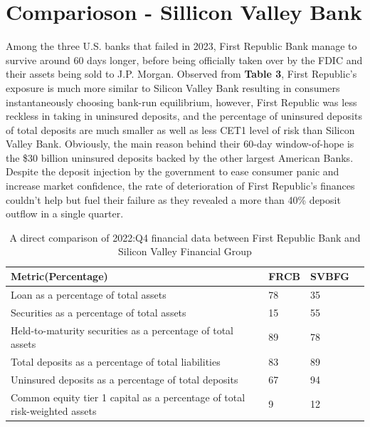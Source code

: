 \documentclass[a4paper]{article}
\begin{document}
\section{Comparioson - Sillicon Valley Bank} \label{Comparioson}
\vspace{-0.25cm}

\quad \quad Among the three U.S. banks that failed in 2023, First Republic Bank manage to survive around 60 days longer, before being officially taken over by the FDIC and their assets being sold to J.P. Morgan. Observed from \textbf{Table 3}, First Republic's exposure is much more similar to Silicon Valley Bank resulting in consumers instantaneously choosing bank-run equilibrium, however, First Republic was less reckless in taking in uninsured deposits, and the percentage of uninsured deposits of total deposits are much smaller as well as less CET1 level of risk  than Silicon Valley Bank. Obviously, the main reason behind their 60-day window-of-hope is the \$30 billion uninsured deposits backed by the other largest American Banks. Despite the deposit injection by the government to ease consumer panic and increase market confidence, the rate of deterioration of First Republic's finances couldn't help but fuel their failure as they revealed a more than 40\% deposit outflow in a single quarter.

\begin{table}[]
    \centering
    \begin{tabular}{|p{7.5cm}||p{1cm}||p{1cm}||p{2.5cm}|}
        \hline
        \textrm{Metric(Percentage)}& \textrm{FRCB}& \textrm{SVBFG}\\
        \hline
        Loan as a percentage of total assets & 78 & 35\\
        \hline
        Securities as a percentage of total assets & 15 &  55 \\
        \hline
        Held-to-maturity securities as a percentage of total assets & 89 & 78\\
        \hline
        Total deposits as a percentage of total liabilities & 83 & 89\\
        \hline
        Uninsured deposits as a percentage of total deposits & 67 & 94 \\
        \hline
        Common equity tier 1 capital as a percentage of total risk-weighted assets & 9 & 12\\
        \hline   
    \end{tabular}
    \caption{A direct comparison of 2022:Q4 financial data between First Republic Bank and Silicon Valley Financial Group}
    
    \label{tab:my_label}
\end{table}
\end{document}
